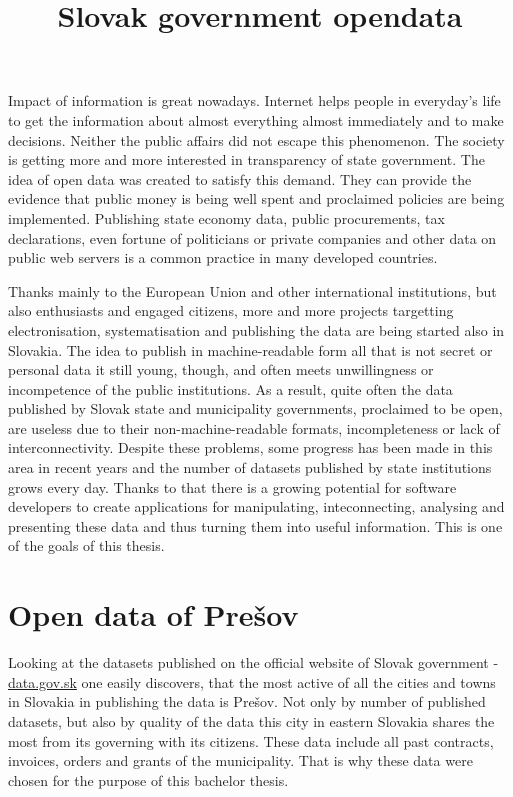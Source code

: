 \documentclass[thesis=B,english]{sprlajur-slovakopendata}[2018/05/12]
\title{Slovak government opendata}
\begin{document}
\begin{introduction}
	Impact of information is great nowadays. Internet helps people in everyday's life to get the information about almost everything almost immediately and to make decisions.
	Neither the public affairs did not escape this phenomenon. The society is getting more and more interested in transparency of state government. The idea of open data was created to satisfy this demand. They can provide the evidence that public money is being well spent and proclaimed policies are being implemented. Publishing state economy data, public procurements, tax declarations, even fortune of politicians or private companies and other data on public web servers is a common practice in many developed countries.
	\par Thanks mainly to the European Union and other international institutions, but also enthusiasts and engaged citizens, more and more projects targetting electronisation, systematisation and publishing the data are being started also in Slovakia. The idea to publish in machine-readable form all that is not secret or personal data it still young, though, and often meets unwillingness or incompetence of the public institutions. As a result, quite often the data published by Slovak state and municipality governments, proclaimed to be open, are useless due to their non-machine-readable formats, incompleteness or lack of interconnectivity.
	Despite these problems, some progress has been made in this area in recent years and the number of datasets published by state institutions grows every day. Thanks to that there is a growing potential for software developers to create applications for manipulating, inteconnecting, analysing and presenting these data and thus turning them into useful information. This is one of the goals of this thesis.
	\section*{Open data of Prešov}
	Looking at the datasets published on the official website of Slovak government - \href{https://data.gov.sk}{data.gov.sk} one easily discovers, that the most active of all the cities and towns in Slovakia in publishing the data is Prešov. Not only by number of published datasets, but also by quality of the data this city in eastern Slovakia shares the most from its governing with its citizens. These data include all past contracts, invoices, orders and grants of the municipality. That is why these data were chosen for the purpose of this bachelor thesis.

\end{introduction}
\end{document}
